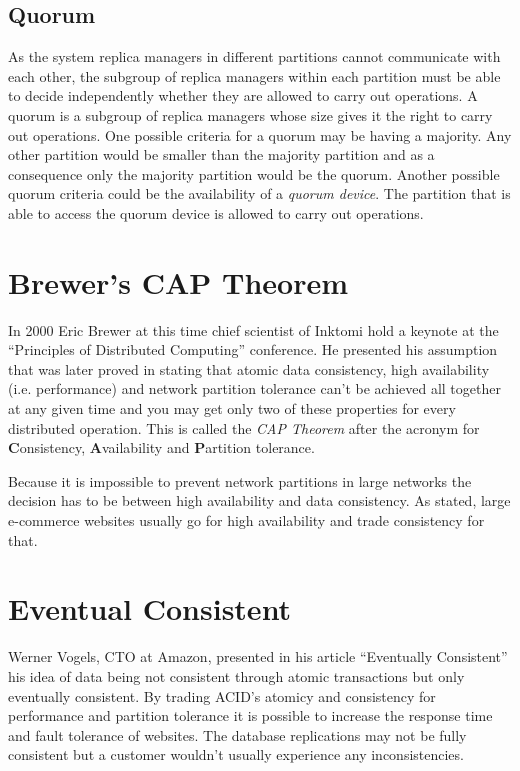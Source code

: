 \subsection{Quorum}

As the system replica managers in different partitions cannot
communicate with each other, the subgroup of replica managers
within each partition must be able to decide independently whether
they are allowed to carry out operations. A quorum is a subgroup of
replica managers whose size gives it the right to carry out
operations. \cite{Coulouris} One possible criteria for a
quorum may be having a majority. Any other partition would be
smaller than the majority partition and as a consequence only the
majority partition would be the quorum. Another possible quorum
criteria could be the availability of a \emph{quorum device}. The
partition that is able to access the quorum device is allowed to
carry out operations.

\section{Brewer's CAP Theorem}

In 2000 Eric Brewer at this time chief scientist of Inktomi hold a
keynote at the ``Principles of Distributed Computing'' conference.
He presented his assumption that was later proved in \cite{brewers-conjecture} 
stating that atomic data consistency, high availability (i.e.
performance) and network partition tolerance can't be achieved all
together at any given time and you may get only two of these
properties for every distributed operation. This is called the \emph{CAP
Theorem} after the acronym for \textbf{C}onsistency,
\textbf{A}vailability and \textbf{P}artition tolerance.

Because it is impossible to prevent network partitions in large
networks the decision has to be between high availability and data
consistency. As stated, large e-commerce websites usually go for
high availability and trade consistency for that.

\section{Eventual Consistent}

Werner Vogels, CTO at Amazon, presented in his article
``Eventually Consistent'' \cite{vogels}
his idea of data being not consistent through atomic transactions
but only eventually consistent. By trading ACID's atomicy and
consistency for performance and partition tolerance it is possible
to increase the response time and fault tolerance of websites. The
database replications may not be fully consistent but a customer
wouldn't usually experience any inconsistencies.

